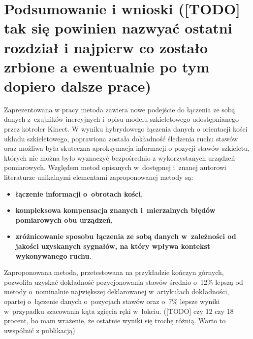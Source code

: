\chapter{Podsumowanie i wnioski ([TODO] tak się powinien nazwyać ostatni rozdział i najpierw co zostało zrbione a ewentualnie po tym dopiero dalsze prace)}\label{chap:finalSummary}

Zaprezentowana w pracy metoda zawiera nowe podejście do łączenia ze sobą danych z~czujników inercyjnych i~opisu modelu szkieletowego udostępnianego przez kotroler Kinect. W wyniku hybrydowego łączenia danych o orientacji kości układu szkieletowego, poprawiona została dokładność śledzenia ruchu stawów oraz możliwa była skuteczna aproksymacja informacji o pozycji stawów szkieletu, których nie można było wyznaczyć bezpośrednio z wykorzystanych urządzeń pomiarowych. Względem metod opisanych w~dostępnej i~znanej autorowi literaturze unikalnymi elementami zaproponowanej metody są:
\begin{itemize}
	\item \textbf{łączenie informacji o~obrotach kości},\\
	\item \textbf{kompleksowa kompensacja znanych i~mierzalnych błędów pomiarowych obu urządzeń}, \\
	\item \textbf{zróżnicowanie sposobu łączenia ze sobą danych w~zależności od jakości uzyskanych sygnałów, na który wpływa kontekst wykonywanego ruchu}.
\end{itemize}

Zaproponowana metoda, przetestowana na przykładzie kończyn górnych, pozwoliła uzyskać dokładność pozycjonowania stawów średnio o~12\% lepszą od metody o~nominalnie największej deklarowanej w~artykułach dokładności, opartej o~łączenie danych o~pozycjach stawów oraz o~7\% lepsze wyniki w~przypadku szacowania kąta zgięcia ręki w~łokciu. ([TODO] czy 12 czy 18 procent, bo mam wrażenie, że ostatnie wyniki się trochę różnią. Warto to uwspółnić z publikacją)\\

